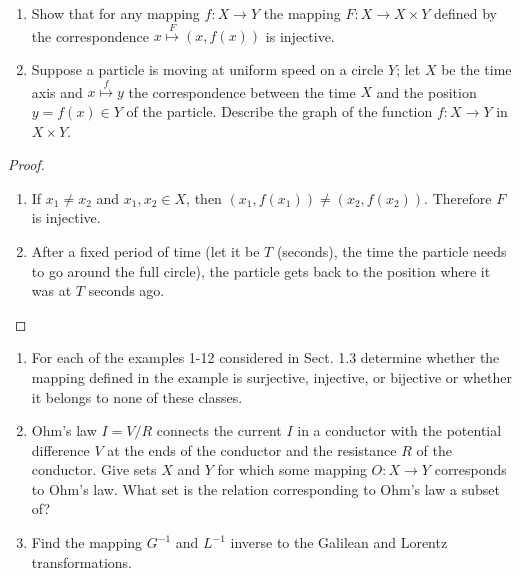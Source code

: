 \begin{exercise}
    \begin{enumerate}[label={(\alph*)}]
        \item Show that for any mapping $f: X\to Y$ the mapping $F: X\to X\times Y$ defined by the correspondence $x\stackrel{F}{\longmapsto} (x, f(x))$ is injective.
        \item Suppose a particle is moving at uniform speed on a circle $Y$; let $X$ be the time axis and $x\stackrel{f}{\longmapsto} y$ the correspondence between the time $X$ and the position $y = f(x)\in Y$ of the particle. Describe the graph of the function $f: X\to Y$ in $X\times Y$.
    \end{enumerate}
\end{exercise}

\begin{proof}
    \begin{enumerate}[label={(\alph*)}]
        \item If $x_{1}\ne x_{2}$ and $x_{1}, x_{2}\in X$, then $(x_{1}, f(x_{1}))\ne (x_{2}, f(x_{2}))$. Therefore $F$ is injective.
        \item After a fixed period of time (let it be $T$ (seconds), the time the particle needs to go around the full circle), the particle gets back to the position where it was at $T$ seconds ago.
    \end{enumerate}
\end{proof}
\newpage

\begin{exercise}
    \begin{enumerate}[label={(\alph*)}]
        \item For each of the examples 1{-}12 considered in Sect. 1.3 determine whether the mapping defined in the example is surjective, injective, or bijective or whether it belongs to none of these classes.
        \item Ohm{'}s law $I = V/R$ connects the current $I$ in a conductor with the potential difference $V$ at the ends of the conductor and the resistance $R$ of the conductor. Give sets $X$ and $Y$ for which some mapping $O: X\to Y$ corresponds to Ohm{'}s law. What set is the relation corresponding to Ohm{'}s law a subset of?
        \item Find the mapping $G^{-1}$ and $L^{-1}$ inverse to the Galilean and Lorentz transformations.
    \end{enumerate}
\end{exercise}


